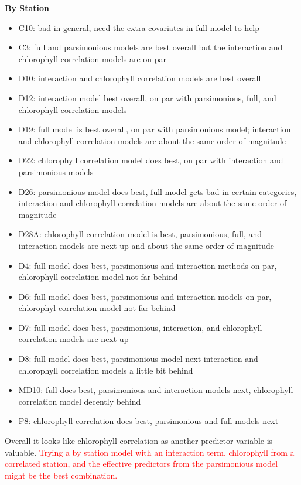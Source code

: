 \documentclass[12pt]{amsart}
\begin{document}
\textbf{By Station}
\begin{itemize}
\item C10: bad in general, need the extra covariates in full model to help
\item C3: full and parsimonious models are best overall but the interaction and chlorophyll correlation models are on par
\item D10: interaction and chlorophyll correlation models are best overall
\item D12: interaction model best overall, on par with parsimonious, full, and chlorophyll correlation models
\item D19: full model is best overall, on par with parsimonious model; interaction and chlorophyll correlation models are about the same order of magnitude
\item D22: chlorophyll correlation model does best, on par with interaction and parsimonious models
\item D26: parsimonious model does best, full model gets bad in certain categories, interaction and chlorophyll correlation models are about the same order of magnitude
\item D28A: chlorophyll correlation model is best, parsimonious, full, and interaction models are next up and about the same order of magnitude
\item D4: full model does best, parsimonious and interaction methods on par, chlorophyll correlation model not far behind
\item D6: full model does best, parsimonious and interaction models on par, chlorophyl correlation model not far behind
\item D7: full model does best, parsimonious, interaction, and chlorophyll correlation models are next up
\item D8: full model does best, parsimonious model next interaction and chlorophyll correlation models a little bit behind
\item MD10: full does best, parsimonious and interaction models next, chlorophyll correlation model decently behind
\item P8: chlorophyll correlation does best, parsimonious and full models next
\end{itemize}

Overall it looks like chlorophyll correlation as another predictor variable is valuable. \textcolor{red}{Trying a by station model with an interaction term, chlorophyll from a correlated station, and the effective predictors from the parsimonious model might be the best combination.}
\end{document}
